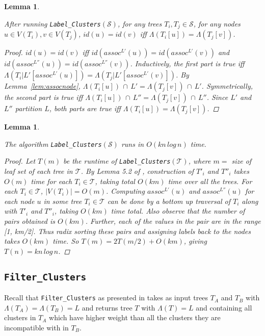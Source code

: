 \documentclass{article}
\newcommand{\leafset}{\Lambda}
\newtheorem{labelclusterscorrectness}[incompatibility]{Lemma}
\newtheorem{labelclustersruntime}[incompatibility]{Lemma}
\begin{document}
    \begin{labelclusterscorrectness}
        \label{lem:labelclusterscorrectness}

        After running \texttt{Label\_Clusters}$(\mathcal{S})$, for any trees $T_i, T_j \in \mathcal{S}$, for any nodes $u \in V(T_i), v \in V(T_j)$, $id(u) = id(v)$ iff $\leafset(T_i[u]) = \leafset(T_j[v])$.

        \begin{proof}
            $id(u) = id(v)$ iff $id(assoc^{L'}(u)) = id(assoc^{L'}(v))$ and $id(assoc^{L''}(u)) = id(assoc^{L''}(v))$. Inductively, the first part is true iff $\leafset(T_i|L'[assoc^{L'}(u)]) = \leafset(T_j|L'[assoc^{L'}(v)])$. By Lemma~\ref{lem:assocnode}, $\leafset(T_i[u])\, \cap\, L' = \leafset(T_j[v])\, \cap\, L'$. Symmetrically, the second part is true iff $\leafset(T_i[u])\, \cap\, L'' = \leafset(T_j[v])\, \cap\, L''$. Since $L'$ and $L''$ partition $L$, both parts are true iff $\leafset(T_i[u]) = \leafset(T_j[v])$.
        \end{proof}
    \end{labelclusterscorrectness}

    \begin{labelclustersruntime}
        \label{lem:labelclustersruntime}

        The algorithm \texttt{Label\_Clusters}$(\mathcal{S})$ runs in $O(kn\,log\,n)$ time.

        \begin{proof}
            Let $T(m)$ be the runtime of \texttt{Label\_Clusters}$(\mathcal{T})$, where $m =$ size of leaf set of each tree in $\mathcal{T}$. By Lemma 5.2 of \cite{farach1995fast}, construction of $T'_i$ and $T''_i$ takes $O(m)$ time for each $T_i \in \mathcal{T}$, taking total $O(km)$ time over all the trees. For each $T_i \in \mathcal{T}$, $|V(T_i)| = O(m)$. Computing $assoc^{L'}(u)$ and $assoc^{L''}(u)$ for each node $u$ in some tree $T_i \in \mathcal{T}$ can be done by a bottom up traversal of $T_i$ along with $T'_i$ and $T''_i$, taking $O(km)$ time total. Also observe that the number of pairs obtained is $O(km)$. Further, each of the values in the pair are in the range [1, km/2]. Thus radix sorting these pairs and assigning labels back to the nodes takes $O(km)$ time. So $T(m) = 2T(m/2) + O(km)$, giving $T(n) = kn\,log\,n$.
        \end{proof}
    \end{labelclustersruntime}

    \subsection{\texttt{Filter\_Clusters}}
    Recall that \texttt{Filter\_Clusters} as presented in \cite{jansson2018algorithms} takes as input trees $T_A$ and $T_B$ with $\leafset(T_A) = \leafset(T_B) = L$ and returns tree $T$ with $\leafset(T) = L$ and containing all clusters in $T_A$ which have higher weight than all the clusters they are incompatible with in $T_B$.\\
\end{document}
